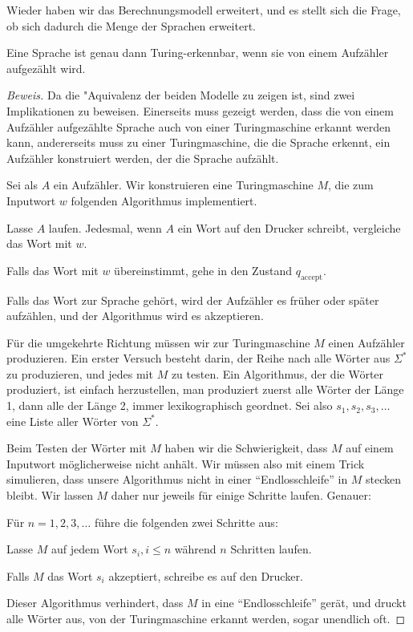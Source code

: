 Wieder haben wir das Berechnungsmodell erweitert, und es stellt sich
die Frage, ob sich dadurch die Menge der Sprachen erweitert.

\begin{satz}
Eine Sprache ist genau dann Turing-erkennbar, wenn sie
von einem Aufzähler aufgezählt wird.\end{satz}

\begin{proof}[Beweis]
Da die "Aquivalenz der beiden Modelle zu zeigen ist, sind zwei Implikationen
zu beweisen. Einerseits muss gezeigt werden, dass die von einem
Aufzähler aufgezählte Sprache auch von einer Turingmaschine
erkannt werden kann, andererseits muss zu einer Turingmaschine, die
die Sprache erkennt, ein Aufzähler konstruiert werden, der die Sprache
aufzählt.

Sei als $A$ ein Aufzähler. Wir konstruieren eine Turingmaschine $M$, die
zum Inputwort $w$ folgenden Algorithmus implementiert.
\begin{compactenum}
\item Lasse $A$ laufen. Jedesmal, wenn $A$ ein Wort auf den Drucker schreibt,
vergleiche das Wort mit $w$.
\item Falls das Wort mit $w$ übereinstimmt, gehe in den Zustand
$q_{\text{accept}}$.
\end{compactenum}
Falls das Wort zur Sprache gehört, wird der Aufzähler es früher
oder später aufzählen, und der Algorithmus wird es akzeptieren.

Für die umgekehrte Richtung müssen wir zur Turingmaschine $M$
einen Aufzähler produzieren.
Ein erster Versuch besteht darin, der Reihe nach alle Wörter aus
$\Sigma^*$ zu produzieren, und jedes mit $M$ zu testen.
Ein Algorithmus, der die Wörter produziert, ist einfach herzustellen,
man produziert zuerst alle Wörter der Länge 1, dann alle der Länge 2,
immer lexikographisch geordnet.
Sei also $s_1,s_2,s_3,\dots$ eine Liste aller Wörter von $\Sigma^*$.

Beim Testen der Wörter mit $M$
haben wir die Schwierigkeit, dass $M$ auf einem Inputwort
möglicherweise nicht anhält. Wir müssen also mit einem Trick
simulieren, dass unsere Algorithmus nicht in einer ``Endlosschleife''
in $M$ stecken bleibt. Wir lassen $M$ daher nur jeweils für einige
Schritte laufen.
Genauer:
\begin{compactenum}
\item Für $n=1,2,3,\dots$ führe die folgenden zwei Schritte aus:
\item Lasse $M$ auf jedem Wort $s_i, i \le n$ während $n$ Schritten
laufen.
\item Falls $M$ das Wort $s_i$ akzeptiert, schreibe es auf den Drucker.
\end{compactenum}
Dieser Algorithmus verhindert, dass $M$ in eine ``Endlosschleife''
gerät, und druckt alle Wörter aus, von der Turingmaschine erkannt
werden, sogar unendlich oft.
\end{proof}

